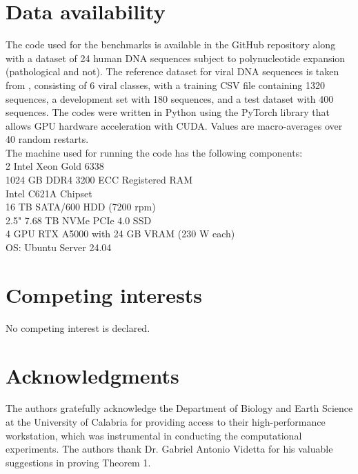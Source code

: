 \documentclass{article}
\theoremstyle{remark}
\begin{document}
\section{Data availability}

The code used for the benchmarks is available in the GitHub repository \cite{ref15} along with a dataset of 24 human DNA sequences subject to polynucleotide expansion (pathological and not). The reference dataset for viral DNA sequences is taken from \cite{ref14}, consisting of 6 viral classes, with a training CSV file containing 1320 sequences, a development set with 180 sequences, and a test dataset with 400 sequences. The codes were written in Python using the PyTorch library\cite{ref34} that allows GPU hardware acceleration with CUDA\cite{ref35}. 
Values are macro-averages over 40 random restarts.\\
The machine used for running the code has the following components:\\
2 Intel Xeon Gold 6338\\
1024 GB DDR4 3200 ECC Registered RAM\\
Intel C621A Chipset\\
16 TB SATA/600 HDD (7200 rpm)\\
2.5" 7.68 TB NVMe PCIe 4.0 SSD\\
4 GPU RTX A5000 with 24 GB VRAM (230 W each)\\
OS: Ubuntu Server 24.04

\section{Competing interests}
No competing interest is declared.


\section{Acknowledgments}

The authors gratefully acknowledge the Department of Biology and Earth Science at the University of Calabria for providing access to their high-performance workstation, which was instrumental in conducting the computational experiments.
The authors thank Dr. Gabriel Antonio Videtta for his valuable suggestions in proving Theorem 1.
\end{document}
